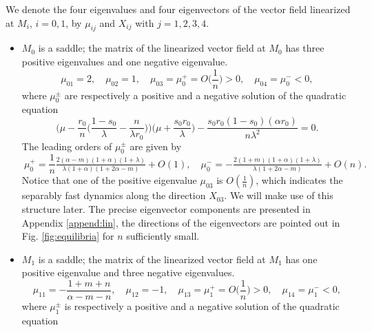 \documentclass[11pt]{article}
\def\BO{{{O}}}
\theoremstyle{remark}
\begin{document}
We denote the four eigenvalues and four eigenvectors of the vector field linearized at $M_i$, $i=0,1$,  by $\mu_{ij}$ and $X_{ij}$ with $j=1,2,3,4$.
\begin{itemize}
 \item $M_0$ is a saddle; the matrix of the linearized vector field at $M_0$ has three positive eigenvalues and one negative eigenvalue.
 \begin{equation} \label{eq:eigM0}
  \mu_{01} = 2, \quad \mu_{02}=1, \quad \mu_{03}=\mu_0^+=\BO\Big(\frac{1}{n}\Big)>0, \quad \mu_{04}=\mu_0^{-}<0,
 \end{equation}
where $\mu_0^\pm$ are respectively a positive and a negative solution of the quadratic equation
 $$
 \Big(\mu - \frac{r_0}{n}\Big(\frac{1-s_0}{\lambda}-\frac{n}{\lambda r_0}\Big)\Big)\Big(\mu + \frac{s_0r_0}{\lambda}\Big) -
 \frac{s_0r_0(1-s_0)(\alpha r_0)}{n\lambda^2} = 0.
 $$
The leading orders of $\mu_0^\pm$ are given by
$$\
\mu_0^+ = \frac{1}{n} \tfrac{2(\alpha-m)(1+\alpha)(1+\lambda)}{\lambda(1+\alpha)(1+2\alpha-m)}+\BO(1), \quad
\mu_0^- = -\tfrac{2(1+m)(1+\alpha)(1+\lambda)}{\lambda(1+2\alpha-m)}  + \BO(n).$$
Notice that one of the positive eigenvalue $\mu_{03}$ is $\BO( \frac{1}{n})$, which indicates the separably fast dynamics along the direction $X_{03}$. We will make use of this structure later.
The precise eigenvector components are presented in Appendix \ref{append:lin}, the directions of the eigenvectors are
pointed out in Fig. \ref{fig:equilibria} for $n$ sufficiently small.
 \item $M_1$ is a saddle;  the matrix of the linearized vector field at $M_1$ has one positive eigenvalue and three negative eigenvalues.
\begin{equation} \label{eq:eigM1}
 \mu_{11}=-\frac{1+m+n}{\alpha-m-n}, \quad \mu_{12}=-1, \quad \mu_{13}=\mu_1^+=\BO\Big(\frac{1}{n}\Big)>0, \quad \mu_{14}=\mu_1^{-}<0,
\end{equation}
where $\mu_1^\pm$ is respectively a positive and a negative solution of the quadratic equation

\end{itemize}
\end{document}
